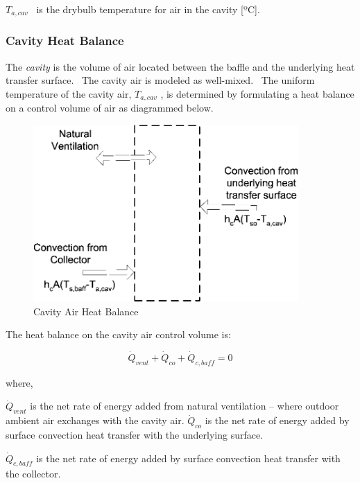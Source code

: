 \({T_{a,cav}}\) ~is the drybulb temperature for air in the cavity {[}ºC{]}.

\subsubsection{Cavity Heat Balance}\label{cavity-heat-balance}

The \emph{cavity} is the volume of air located between the baffle and the underlying heat transfer surface.~ The cavity air is modeled as well-mixed.~ The uniform temperature of the cavity air, \({T_{a,cav}}\) , is determined by formulating a heat balance on a control volume of air as diagrammed below.

\begin{figure}[hbtp] %
\centering
\includegraphics[width=0.9\textwidth, height=0.9\textheight, keepaspectratio=true]{media/image469.png}
\caption{Cavity Air Heat Balance \protect \label{fig:cavity-air-heat-balance}}
\end{figure}

The heat balance on the cavity air control volume is:

\begin{equation}
{\dot Q_{vent}} + {\dot Q_{co}} + {\dot Q_{c,baff}} = 0
\end{equation}

where,

\(\dot{Q}_{vent}\) is the net rate of energy added from natural ventilation -- where outdoor ambient air exchanges with the cavity air. \(\dot{Q}_{co}\) is the net rate of energy added by surface convection heat transfer with the underlying surface.

\({\dot Q_{c,baff}}\) is the net rate of energy added by surface convection heat transfer with the collector.

